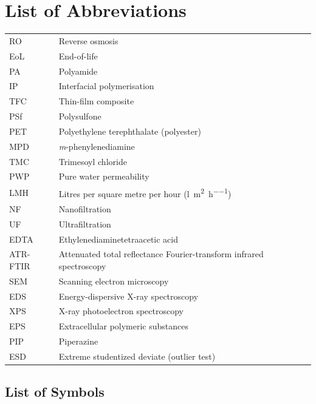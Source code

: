 \chapter*{List of Abbreviations}

\begin{tabular}{@{}ll@{}}
  RO    & Reverse osmosis \\
  EoL   & End-of-life \\
  PA    & Polyamide \\
  IP    & Interfacial polymerisation \\
  TFC   & Thin-film composite \\
  PSf   & Polysulfone \\
  PET   & Polyethylene terephthalate (polyester) \\
  MPD   & \emph{m}-phenylenediamine \\
  TMC   & Trimesoyl chloride \\
  PWP   & Pure water permeability \\
  LMH   & Litres per square metre per hour (\unit{\litre\per\square\metre\per\hour}) \\
  NF    & Nanofiltration \\
  UF    & Ultrafiltration \\
  EDTA  & Ethylenediaminetetraacetic acid \\
  ATR-FTIR & Attenuated total reflectance Fourier-transform infrared spectroscopy \\
  SEM   & Scanning electron microscopy \\
  EDS   & Energy-dispersive X-ray spectroscopy \\
  XPS   & X-ray photoelectron spectroscopy \\
  EPS   & Extracellular polymeric substances \\
  PIP   & Piperazine \\
  ESD   & Extreme studentized deviate (outlier test) \\
\end{tabular}

\section*{List of Symbols}

